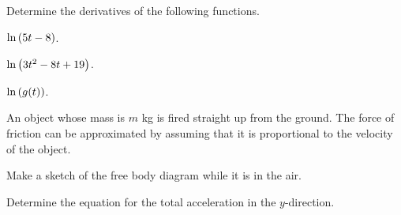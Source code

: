 
\begin{problem}
\item Determine the derivatives of the following functions.
  \begin{subproblem}
    \item $\ln\left( 5t-8\right)$.
      \vfill
    \item $\ln\left( 3t^2 - 8t + 19 \right)$.
      \vfill
    \item $\ln\left( g(t) \right)$.
      \vfill
  \end{subproblem}

  \clearpage

\item An object whose mass is $m$ kg is fired straight up from the
  ground. The force of friction can be approximated by assuming that
  it is proportional to the velocity of the object.

  \begin{subproblem}
  \item Make a sketch of the free body diagram while it is in the air.
    \vfill
  \item Determine the equation for the total acceleration in the $y$-direction.
    \vfill
  \end{subproblem}

\end{problem}


